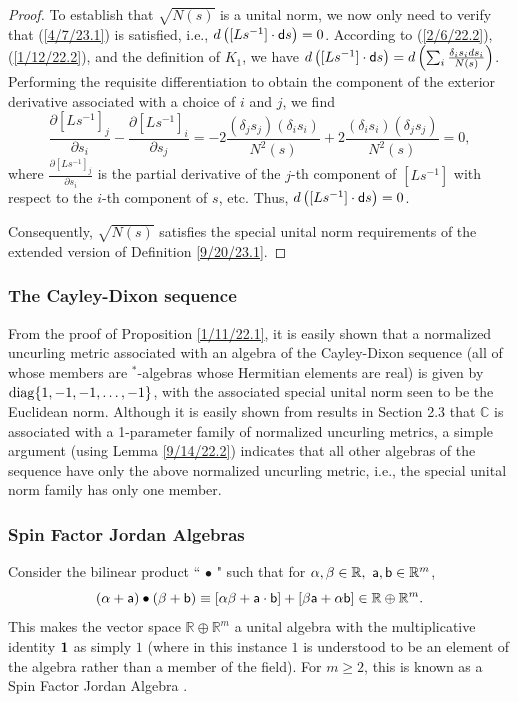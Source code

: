 \documentclass{amsart}
\numberwithin{equation}{section}
\theoremstyle{definition}
\numberwithin{theorem}{section}
\begin{document}
\begin{proof}
 To establish that $\sqrt{N(s)}$ is a unital norm, we  now only need to verify that (\ref{4/7/23.1}) is satisfied, i.e., $d\left([Ls^{-1}]\cdot {\sf d}s\right)=0$.  According to (\ref{2/6/22.2}), (\ref{1/12/22.2}), and the definition  of $K_1$, we have $d\left([Ls^{-1}]\cdot {\sf d}s\right) = d\left(\sum_i \frac{\delta_is_i ds_i}{N(s)}\right)$.  Performing the requisite differentiation to obtain the component of the exterior derivative associated with a choice of $i$ and $j$, we find \[ \frac{\partial [Ls^{-1}]_j}{\partial s_i} - \frac{\partial [Ls^{-1}]_i}{\partial s_j} = -2\frac{(\delta_j s_j)(\delta_i s_i)}{N^2(s)} +
2\frac{(\delta_i s_i)(\delta_j s_j)}{N^2(s)} = 0,  \] where $\frac{\partial [Ls^{-1}]_j}{\partial s_i}$ is the partial derivative of the $j$-th component of $[Ls^{-1}]$ with respect to the $i$-th component of $s$, etc. Thus,  $d\left([Ls^{-1}]\cdot {\sf d}s\right) = 0$.

Consequently, $\sqrt{N(s)}$ satisfies the special unital norm requirements of the extended version of Definition \ref{9/20/23.1}.  
\end{proof}


\subsubsection{The Cayley-Dixon sequence}  From the proof of Proposition \ref{1/11/22.1}, it is easily shown that a normalized uncurling metric associated with an algebra of the Cayley-Dixon sequence (all of whose members are $^*$-algebras whose Hermitian elements are real) is given by ${\rm diag}\{1,-1,-1,\dots,-1\}$, with the associated special unital norm seen to be the Euclidean norm. Although it is easily shown from results in Section 2.3 that $\mathbb{C}$ is associated with a 1-parameter family of normalized uncurling metrics, a simple argument (using Lemma \ref{9/14/22.2}) indicates that all other algebras of the sequence have only the above normalized uncurling metric, i.e., the special unital norm family has only one member.  
 
\subsubsection{Spin Factor Jordan Algebras}  Consider the bilinear product ``$\,\bullet\,$" such that for
$\alpha,\beta\in \mathbb{R},\,\, {\sf a},{\sf b}\in \mathbb{R}^m$,  \begin{equation}  (\alpha+ {\sf a})\bullet (\beta + {\sf b}) \equiv
    [\alpha \beta + {\sf a} \cdot {\sf b}] + [ \beta {\sf a} + \alpha {\sf b}] \in \mathbb{R}\oplus \mathbb{R}^m. \label{12/24/18.1}\end{equation}  This makes the vector space $\mathbb{R}\oplus \mathbb{R}^m$ a unital algebra with the multiplicative identity ${\bf 1}$ as simply $1$ (where in this instance $1$ is understood to be an element of the algebra rather than a member of the field).  For $m\ge 2$, this is known as a Spin Factor Jordan Algebra \cite{mccrimmon:2004}.
\end{document}

